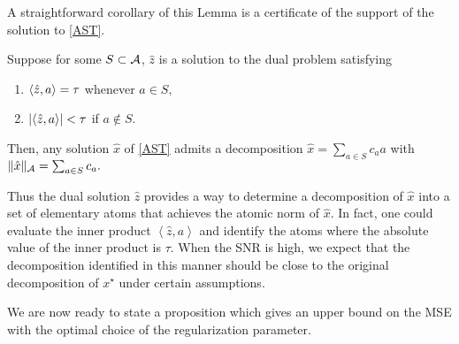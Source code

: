 A straightforward corollary of this Lemma is a certificate of the support of the
solution to \eqref{AST}.

\begin{corollary}
\label{cor:dual-cert-support}

Suppose for some $S \subset \mathcal{A}$,  $\hat{z}$ is a solution to the dual problem  satisfying
\begin{enumerate}
\item $\langle\hat{z}, a\rangle = \tau$ whenever $a \in S,$
\item $|\langle\hat{z}, a\rangle| < \tau$ if $a \not\in S.$
\end{enumerate}
Then, any solution $\hat{x}$ of \eqref{AST} admits a decomposition $\hat{x} =
\sum_{a \in S}{c_a a}$ with $\lVert\hat{x}\rVert_{\mathcal{A}} = \sum_{a \in S}{c_a}.$

\end{corollary}


Thus the dual solution $\hat{z}$ provides a way to determine a
decomposition of $\hat{x}$ into a set of elementary atoms that achieves the
atomic norm of $\hat{x}$. In fact, one could evaluate the inner product
$\left<\hat{z}, a\right>$ and identify the atoms where the absolute value of the
inner product is $\tau$. When the SNR is high, we expect that the
decomposition identified in this manner should be close to the original
decomposition of $x^\star$ under certain assumptions.


We are now ready to state a proposition which gives an upper bound on the MSE
with the optimal choice of the regularization parameter.

